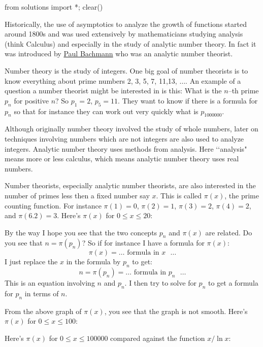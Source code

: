 \begin{python0}
from solutions import *; clear()
\end{python0}

Historically, the use of asymptotics to analyze the
growth of functions started around 1800s and was used extensively
by mathematicians studying analysis (think Calculus) and
especially in the study of analytic number theory. In fact it was
introduced by
\href{https://en.wikipedia.org/wiki/Paul_Gustav_Heinrich_Bachmann}{Paul Bachmann}
who was an analytic number theorist.

Number theory is the study of integers.
One big goal of number
theorists is to know everything about prime numbers 2, 3, 5, 7,
11,13, $\ldots$.
An example of a question a number theorist might be interested in
is this:
What is the $n$--th prime $p_n$ for positive $n$?
So $p_1 = 2$, $p_5 = 11$.
They want to know if there is a formula for $p_n$ so that for
instance they can work out very quickly what is $p_{1000000}$.

Although originally number theory involved the study of whole
numbers, later on techniques involving numbers
which are not integers are also used to analyze integers.
Analytic number theory uses methods from analysis.
Here \lq\lq analysis" means more or less calculus,
which means analytic number theory uses real numbers.

Number theorists, especially analytic number theorists,
are also interested in the number of primes less then a fixed
number say $x$.
This is called $\pi(x)$, the prime counting function.
For instance
$\pi(1) = 0$,
$\pi(2) = 1$,
$\pi(3) = 2$,
$\pi(4) = 2$, and
$\pi(6.2) = 3$.
Here's $\pi(x)$ for $0 \leq x \leq 20$:


By the way I hope you see that the two
concepts $p_n$ and $\pi(x)$ are related.
Do you see that $n = \pi(p_n)$? So if for
instance I have a formula for $\pi(x)$:
\[
 \pi(x) = \ldots \text{ formula in $x$ } \ldots
\]
I just replace the $x$ in the formula by $p_n$ to get:
\[
 n = \pi(p_n) = \ldots \text{ formula in $p_n$ } \ldots
\]
This is an equation involving $n$ and $p_n$. I then try to solve
for $p_n$ to get a formula for $p_n$ in terms of $n$.

From the above graph of $\pi(x)$, you see that the graph is
not smooth.
Here's $\pi(x)$ for $0 \leq x \leq 100$:

Here's $\pi(x)$ for $0 \leq x \leq 100000$ compared against the function $x/\ln x$:


